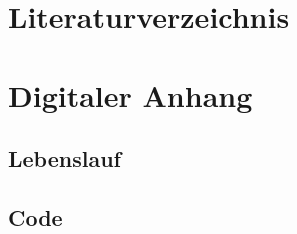 \documentclass[a4paper,12pt]{article}
\begin{document}
\newpage
\section*{Literaturverzeichnis}


\newpage
\listoffigures


\newpage
\section*{Digitaler Anhang}


%

%

%

\subsection*{Lebenslauf}


\subsection*{Code}

\end{document}
